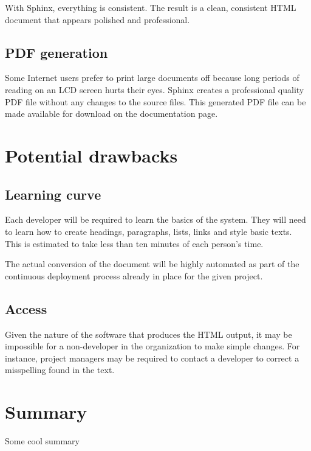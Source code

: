 \documentclass[letterpaper]{report}
\begin{document}
        With Sphinx, everything is consistent. The result is a clean,
        consistent HTML document that appears polished and professional.

    \subsection*{PDF generation}

        Some Internet users prefer to print large documents off because long
        periods of reading on an LCD screen hurts their eyes. Sphinx creates a
        professional quality PDF file without any changes to the source files.
        This generated PDF file can be made available for download on the
        documentation page.

\section*{Potential drawbacks}

    \subsection*{Learning curve}
    
        Each developer will be required to learn the basics of the system. They
        will need to learn how to create headings, paragraphs, lists, links and
        style basic texts. This is estimated to take less than ten minutes of
        each person's time.

        The actual conversion of the document will be highly automated as part
        of the continuous deployment process already in place for the given
        project.

    \subsection*{Access}

        Given the nature of the software that produces the HTML output, it may
        be impossible for a non-developer in the organization to make simple
        changes. For instance, project managers may be required to contact a
        developer to correct a misspelling found in the text.

\section*{Summary}

    Some cool summary
\end{document}
